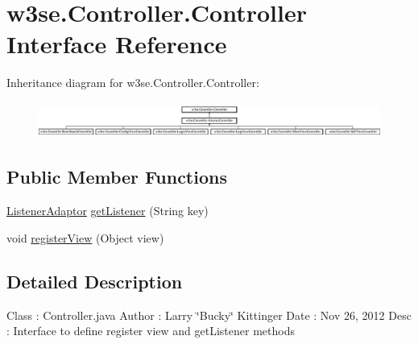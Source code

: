 \hypertarget{interfacew3se_1_1_controller_1_1_controller}{\section{w3se.\-Controller.\-Controller Interface Reference}
\label{interfacew3se_1_1_controller_1_1_controller}
}
Inheritance diagram for w3se.\-Controller.\-Controller\-:\begin{figure}[H]
\begin{center}
\leavevmode
\includegraphics[height=1.176471cm]{interfacew3se_1_1_controller_1_1_controller}
\end{center}
\end{figure}
\subsection*{Public Member Functions}
\begin{DoxyCompactItemize}
\item 
\hyperlink{classw3se_1_1_controller_1_1_listener_adaptor}{Listener\-Adaptor} \hyperlink{interfacew3se_1_1_controller_1_1_controller_aa975aff2875c0c6ab9a9b27334ad7de9}{get\-Listener} (String key)
\item 
void \hyperlink{interfacew3se_1_1_controller_1_1_controller_a9b2ec185962edeac357aae3c98e8389d}{register\-View} (Object view)
\end{DoxyCompactItemize}


\subsection{Detailed Description}
Class \-: Controller.\-java Author \-: Larry \char`\"{}\-Bucky\char`\"{} Kittinger Date \-: Nov 26, 2012 Desc \-: Interface to define register view and get\-Listener methods 

